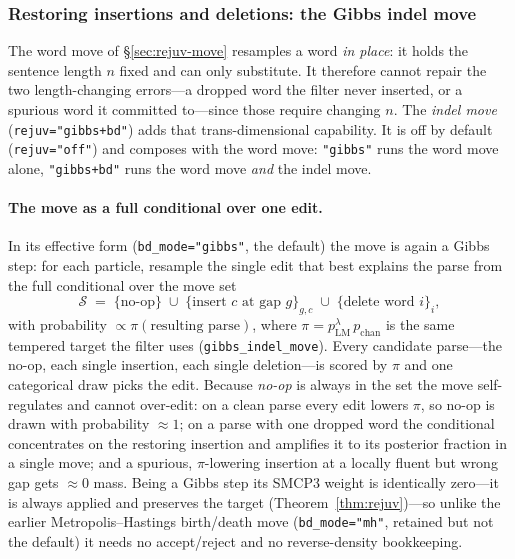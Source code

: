 \documentclass[11pt]{article}
\providecommand{\pLM}{p_{\mathrm{LM}}}
\providecommand{\code}[1]{\texttt{#1}}
\begin{document}
\subsubsection{Restoring insertions and deletions: the Gibbs indel move}
\label{sec:rejuv-indel}

The word move of \S\ref{sec:rejuv-move} resamples a word \emph{in place}: it holds the sentence length $n$ fixed and can only substitute. It therefore cannot repair the two length-changing errors---a dropped word the filter never inserted, or a spurious word it committed to---since those require changing $n$. The \emph{indel move} (\code{rejuv="gibbs+bd"}) adds that trans-dimensional capability. It is off by default (\code{rejuv="off"}) and composes with the word move: \code{"gibbs"} runs the word move alone, \code{"gibbs+bd"} runs the word move \emph{and} the indel move.

\paragraph{The move as a full conditional over one edit.} In its effective form (\code{bd\_mode="gibbs"}, the default) the move is again a Gibbs step: for each particle, resample the single edit that best explains the parse from the full conditional over the move set
\begin{equation}\label{eq:indel-set}
  \mathcal S \;=\; \{\text{no-op}\}\;\cup\;\{\text{insert } c \text{ at gap } g\}_{g,c}\;\cup\;
                    \{\text{delete word } i\}_i,
\end{equation}
with probability $\propto \pi(\text{resulting parse})$, where $\pi = \pLM^{\lambda}\,p_{\mathrm{chan}}$ is the same tempered target the filter uses (\code{gibbs\_indel\_move}). Every candidate parse---the no-op, each single insertion, each single deletion---is scored by $\pi$ and one categorical draw picks the edit. Because \emph{no-op} is always in the set the move self-regulates and cannot over-edit: on a clean parse every edit lowers $\pi$, so no-op is drawn with probability $\approx 1$; on a parse with one dropped word the conditional concentrates on the restoring insertion and amplifies it to its posterior fraction in a single move; and a spurious, $\pi$-lowering insertion at a locally fluent but wrong gap gets $\approx 0$ mass. Being a Gibbs step its SMCP3 weight is identically zero---it is always applied and preserves the target (Theorem~\ref{thm:rejuv})---so unlike the earlier Metropolis--Hastings birth/death move (\code{bd\_mode="mh"}, retained but not the default) it needs no accept/reject and no reverse-density bookkeeping.
\end{document}

